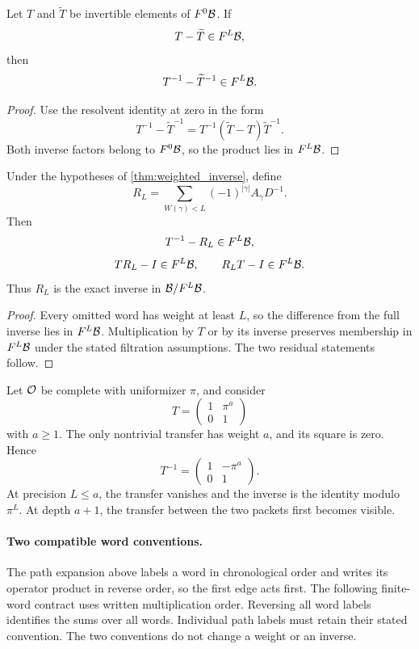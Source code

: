\begin{corollary}\label{cor:inverse_stability}
Let $T$ and $\widetilde T$ be invertible elements of $F^0\mathcal B$.  If
\[
T-\widetilde T\in F^L\mathcal B,
\]
then
\[
T^{-1}-\widetilde T^{-1}\in F^L\mathcal B.
\]
\end{corollary}

\begin{proof}
Use the resolvent identity at zero in the form
\[
T^{-1}-\widetilde T^{-1}
=
T^{-1}(\widetilde T-T)\widetilde T^{-1}.
\]
Both inverse factors belong to $F^0\mathcal B$, so the product lies in $F^L\mathcal B$.
\end{proof}

\begin{corollary}\label{cor:finite_precision}
Under the hypotheses of \cref{thm:weighted_inverse}, define
\[
R_L
=
\sum_{W(\gamma)<L}(-1)^{|\gamma|}A_\gamma D^{-1}.
\]
Then
\[
T^{-1}-R_L\in F^L\mathcal B,
\]
\[
TR_L-I\in F^L\mathcal B,
\qquad
R_LT-I\in F^L\mathcal B.
\]
Thus $R_L$ is the exact inverse in $\mathcal B/F^L\mathcal B$.
\end{corollary}

\begin{proof}
Every omitted word has weight at least $L$, so the difference from the full inverse lies in $F^L\mathcal B$.  Multiplication by $T$ or by its inverse preserves membership in $F^L\mathcal B$ under the stated filtration assumptions.  The two residual statements follow.
\end{proof}

\begin{example}\label{ex:triangular_transfer}
Let ${\mathcal O}$ be complete with uniformizer $\pi$, and consider
\[
T=
\begin{pmatrix}
1&\pi^a\\
0&1
\end{pmatrix}
\]
with $a\geq1$.  The only nontrivial transfer has weight $a$, and its square is zero.  Hence
\[
T^{-1}
=
\begin{pmatrix}
1&-\pi^a\\
0&1
\end{pmatrix}.
\]
At precision $L\leq a$, the transfer vanishes and the inverse is the identity modulo $\pi^L$.  At depth $a+1$, the transfer between the two packets first becomes visible.
\end{example}

\paragraph{Two compatible word conventions.} The path expansion above labels a word in chronological order and writes its operator product in reverse order, so the first edge acts first.  The following finite-word contract uses written multiplication order.  Reversing all word labels identifies the sums over all words. Individual path labels must retain their stated convention.  The two conventions do not change a weight or an inverse.

